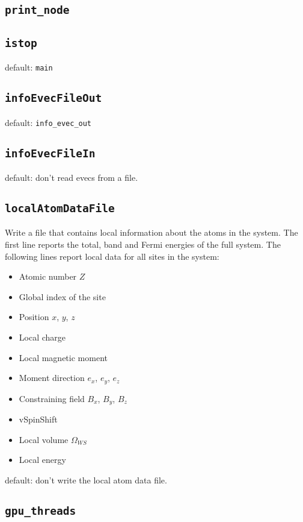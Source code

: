 \subsection{\texttt{print\_node}}

\subsection{\texttt{istop}}
default: \texttt{main}

\subsection{\texttt{infoEvecFileOut}}
default: \texttt{info\_evec\_out}

\subsection{\texttt{infoEvecFileIn}}
default: don't read evecs from a file.

\subsection{\texttt{localAtomDataFile}}
Write a file that contains local information about the atoms in the system.
The first line reports the total, band and Fermi energies of the full system.
The following lines report local data for all sites in the system:
\begin{itemize}
\item Atomic number $Z$
\item Global index of the site
\item Position $x$, $y$, $z$
\item Local charge
\item Local magnetic moment
\item Moment direction $e_x$, $e_y$, $e_z$
\item Constraining field $B_x$, $B_y$, $B_z$
\item vSpinShift
\item Local volume $\Omega_{WS}$
\item Local energy
\end{itemize}

default: don't write the local atom data file.

\subsection{\texttt{gpu\_threads}}

